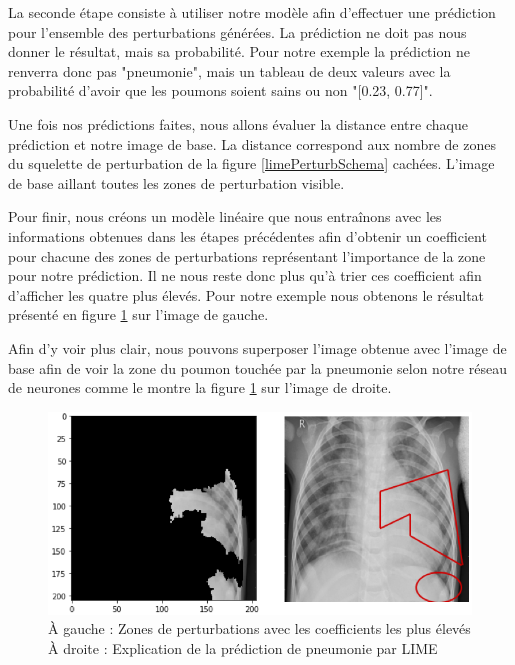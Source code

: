 La seconde étape consiste à utiliser notre modèle afin d'effectuer une prédiction pour l'ensemble des perturbations générées. La prédiction ne doit pas nous donner le résultat, mais sa probabilité. Pour notre exemple la prédiction ne renverra donc pas "pneumonie", mais un tableau de deux valeurs avec la probabilité d'avoir que les poumons soient sains ou non "[0.23, 0.77]".\par
Une fois nos prédictions faites, nous allons évaluer la distance entre chaque prédiction et notre image de base. La distance correspond aux nombre de zones du squelette de perturbation de la figure \ref{limePerturbSchema} cachées. L'image de base aillant toutes les zones de perturbation visible.\par
Pour finir, nous créons un modèle linéaire que nous entraînons avec les informations obtenues dans les étapes précédentes afin d'obtenir un coefficient pour chacune des zones de perturbations représentant l'importance de la zone pour notre prédiction. Il ne nous reste donc plus qu'à trier ces coefficient afin d'afficher les quatre plus élevés. Pour notre exemple nous obtenons le résultat présenté en figure \ref{limeFinalExplain} sur l'image de gauche.

Afin d'y voir plus clair, nous pouvons superposer l'image obtenue avec l'image de base afin de voir la zone du poumon touchée par la pneumonie selon notre réseau de neurones comme le montre la figure \ref{limeFinalExplain} sur l'image de droite.

\begin{figure}[h]
    \includegraphics[scale=0.58]{src_img/limeFinalExplainMerge.png}
    \caption{À gauche : Zones de perturbations avec les coefficients les plus élevés
    À droite : Explication de la prédiction de pneumonie par LIME}
    \label{limeFinalExplain}
\end{figure}
